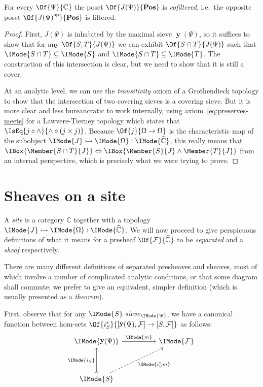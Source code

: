 \documentclass{article}
\newcommand\Posets{\mathbf{Pos}}
\newcommand\OpCat[1]{{{#1}^{\mathsf{op}}}}
\DeclareMathOperator\OpYoneda{\mathbf{y}}
\newcommand\Yoneda[1]{\OpYoneda({#1})}
\newcommand\Psh[1]{\widehat{#1}}
\newcommand\IsSubobject[3]{\IMode{#1}\rightarrowtail\IMode{#2}:\IMode{#3}}
\newcommand\IsSubsetEq[2]{\IMode{#1}\subseteq\IMode{#2}}
\newcommand\IsSieve[2]{\IMode{#2}\ \mathit{sieve}_{\IMode{#1}}}
\begin{document}
\begin{lem}\label{lem:covering-sieves-filtered}
  For every $\Of{\Psi}{\mathbb{C}}$ the poset $\Of{J(\Psi)}{\Posets}$
  is \emph{cofiltered}, i.e.\ the opposite poset
  $\Of{\OpCat{J(\Psi)}}{\Posets}$ is filtered.
\end{lem}
\begin{proof}
  First, $J(\Psi)$ is inhabited by the maximal sieve $\Yoneda{\Psi}$,
  so it suffices to show that for any $\Of{S,T}{J(\Psi)}$ we can
  exhibit $\Of{S\cap T}{J(\Psi)}$ such that $\IsSubsetEq{S\cap T}{S}$
  and $\IsSubsetEq{S\cap T}{T}$. The construction of this intersection
  is clear, but we need to show that it is still a cover.

  At an analytic level, we can use the \emph{transitivity} axiom of a
  Grothendieck topology to show that the intersection of two covering
  sieves is a covering sieve. But it is more clear and less
  bureaucratic to work internally, using
  axiom~\ref{eq:preserves-meets} for a Lawvere-Tierney topology which
  states that $\IsEq{j\circ\land}{\land\circ(j\times j)}$.
%
  Because $\Of{j}{\Omega\to\Omega}$ is the characteristic map of the
  subobject $\IsSubobject{J}{\Omega}{\Psh{\mathbb{C}}}$, this really
  means that
  $\IBox{\Member{S\cap
      T}{J}}\Leftrightarrow\IBox{\Member{S}{J}\land\Member{T}{J}}$
  from an internal perspective, which is precisely what we were trying
  to prove.
\end{proof}

\section{Sheaves on a site}

A \emph{site} is a category $\mathbb{C}$ together with a topology
$\IsSubobject{J}{\Omega}{\Psh{\mathbb{C}}}$. We will now
proceed to give perspicuous definitions of what it means for a
presheaf $\Of{\mathcal{F}}{\Psh{\mathbb{C}}}$ to be \emph{separated} and a
\emph{sheaf} respectively.

There are many different definitions of separated presheaves and
sheaves, most of which involve a number of complicated analytic
conditions, or that some diagram shall commute; we prefer to give an
equivalent, simpler definition (which is usually presented as a
\emph{theorem}).

First, observe that for any $\IsSieve{\Psi}{S}$, we have a canonical
function between hom-sets
$\Of{i_S^*}{[\Yoneda{\Psi},\mathcal{F}]\to [S,\mathcal{F}]}$
as follows:
\[
  \begin{tikzcd}[sep=huge]
    \IMode{\Yoneda{\Psi}}
    \arrow[r, "\IMode{m}"]
    &
    \IMode{\mathcal{F}}
    \\
    \IMode{S}
    \arrow[u,rightarrowtail,"\IMode{i_S}"]
    \arrow[ur,swap,dashed,"\OMode{i_S^*m}"]
  \end{tikzcd}
\]
\end{document}
